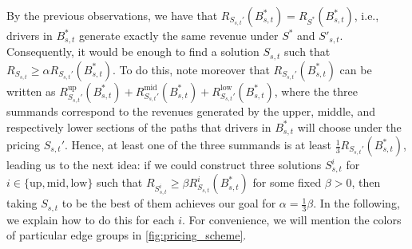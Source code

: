 By the previous observations, we have that $R_{S_{s, t}'}(B_{s, t}^*) = R_{S^*}(B_{s, t}^*)$, i.e., drivers in $B_{s, t}^*$ generate exactly the same revenue under $S^*$ and $S'_{s, t}$. Consequently, it would be enough to find a solution $S_{s, t}$ such that $R_{S_{s, t}} \geq \alpha R_{S_{s, t}'}(B_{s, t}^*)$. To do this, note moreover that $R_{S_{s, t}'}(B_{s, t}^*)$ can be written as $R_{S_{s, t}'}^\mathrm{up}(B_{s, t}^*) + R_{S_{s, t}'}^\mathrm{mid}(B_{s, t}^*) + R_{S_{s, t}'}^\mathrm{low}(B_{s, t}^*)$, where the three summands correspond to the revenues generated by the upper, middle, and respectively lower sections of the paths that drivers in $B_{s, t}^*$ will choose under the pricing $S_{s, t}'$.
Hence, at least one of the three summands is at least $\frac{1}{3} R_{S_{s, t}'}(B_{s, t}^*)$, leading us to the next idea: if we could construct three solutions $S_{s, t}^i$ for $i \in \{\mathrm{up}, \mathrm{mid}, \mathrm{low}\}$ such that $R_{S_{s, t}^i} \geq \beta R_{S_{s, t}}^i (B_{s, t}^*)$ for some fixed $\beta > 0$, then taking $S_{s, t}$ to be the best of them achieves our goal for $\alpha = \frac{1}{3} \beta$. In the following, we explain how to do this for each $i$.
For convenience, we will mention the colors of particular edge groups in \cref{fig:pricing_scheme}.

